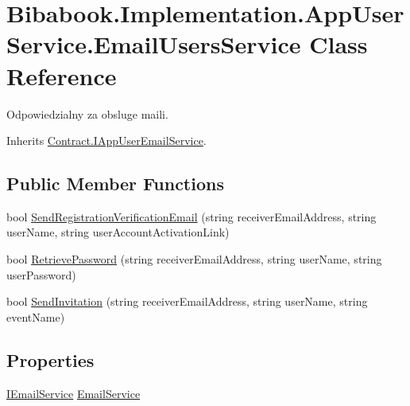 \hypertarget{class_bibabook_1_1_implementation_1_1_app_user_service_1_1_email_users_service}{}\section{Bibabook.\+Implementation.\+App\+User\+Service.\+Email\+Users\+Service Class Reference}
\label{class_bibabook_1_1_implementation_1_1_app_user_service_1_1_email_users_service}


Odpowiedzialny za obsluge maili.  




Inherits \hyperlink{interface_contract_1_1_i_app_user_email_service}{Contract.\+I\+App\+User\+Email\+Service}.

\subsection*{Public Member Functions}
\begin{DoxyCompactItemize}
\item 
bool \hyperlink{class_bibabook_1_1_implementation_1_1_app_user_service_1_1_email_users_service_afb5f83afe95be103c75dafad43a34fa7}{Send\+Registration\+Verification\+Email} (string receiver\+Email\+Address, string user\+Name, string user\+Account\+Activation\+Link)
\item 
bool \hyperlink{class_bibabook_1_1_implementation_1_1_app_user_service_1_1_email_users_service_a082e5666d6f2f5f08b51ae0644097fc7}{Retrieve\+Password} (string receiver\+Email\+Address, string user\+Name, string user\+Password)
\item 
bool \hyperlink{class_bibabook_1_1_implementation_1_1_app_user_service_1_1_email_users_service_ad05dcbb5e06b768a65373b44a39d0167}{Send\+Invitation} (string receiver\+Email\+Address, string user\+Name, string event\+Name)
\end{DoxyCompactItemize}
\subsection*{Properties}
\begin{DoxyCompactItemize}
\item 
\hyperlink{interface_contract_1_1_i_email_service}{I\+Email\+Service} \hyperlink{class_bibabook_1_1_implementation_1_1_app_user_service_1_1_email_users_service_a9d0e2425374cd78f72ff2c959739fe86}{Email\+Service}
\end{DoxyCompactItemize}


